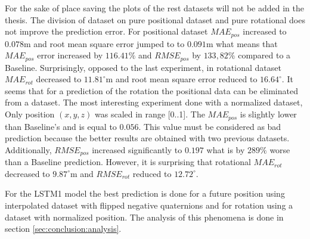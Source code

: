 For the sake of place saving the plots of the rest datasets will not be added in the thesis. The division of dataset on pure positional dataset and pure rotational does not improve the prediction error. For positional dataset $MAE_{pos}$ increased to $0.078$m and root mean square error jumped to to $0.091$m what means that $MAE_{pos}$ error increased by $116.41\%$ and $RMSE_{pos}$ by $133,82\%$ compared to a Baseline. Surprisingly, opposed to the last experiment, in rotational dataset $MAE_{rot}$ decreased to $11.81^{\circ}$m and root mean square error reduced to $16.64^{\circ}$. It seems that for a prediction of the rotation the positional data can be eliminated from a dataset. The most interesting experiment done with a normalized dataset, Only position $(x, y, z)$ was scaled in range [0..1]. The $MAE_{pos}$ is slightly lower than Baseline's and is equal to $0.056$. This value must be considered as bad prediction because the better results are obtained with two previous datasets. Additionally, $RMSE_{pos}$ increased significantly to $0.197$ what is by $289\%$ worse than a Baseline prediction. However, it is surprising that rotational $MAE_{rot}$ decreased to $9.87^{\circ}$m and $RMSE_{rot}$ reduced to  $12.72^{\circ}$. 

For the LSTM1 model the best prediction is done for a future position using interpolated dataset with flipped negative quaternions and for rotation using a dataset with normalized position. The analysis of this phenomena is done in section \ref{sec:conclusion:analysis}.

